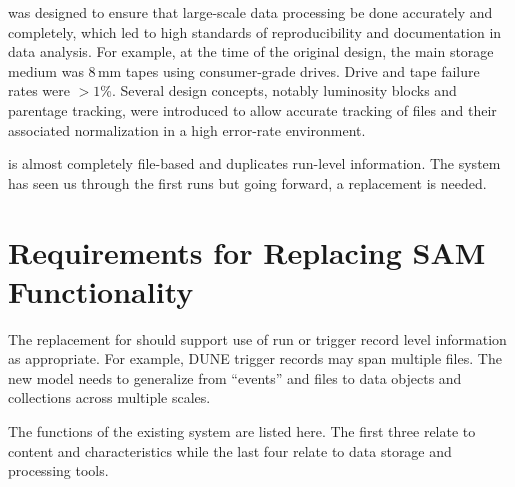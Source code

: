 \documentclass[../main-v1.tex]{subfiles}
\begin{document}

 was designed to ensure that large-scale data processing be done accurately and completely,  which led to  high standards of reproducibility and documentation in data analysis.
For example, at the time of the original design, the main storage medium was 8\,mm tapes using consumer-grade drives.  Drive and tape failure rates were $>1$\%.  Several  design concepts, notably luminosity blocks and parentage tracking, were introduced to allow accurate tracking of files and their associated normalization in a high error-rate environment. 

 is almost completely file-based and duplicates run-level information.  The %
system has seen us through the first  runs but going forward, a replacement is needed. %

\section{Requirements for Replacing SAM Functionality }




 The replacement for  should support use of run or trigger record level information as appropriate. 
For example,  DUNE trigger records may span multiple files. The new model needs to generalize from ``events'' and files to data objects and collections across multiple scales. 

The functions of the existing  system are listed here. The first three %
relate to content and characteristics while the last four relate to data storage and processing tools.
\end{document}
